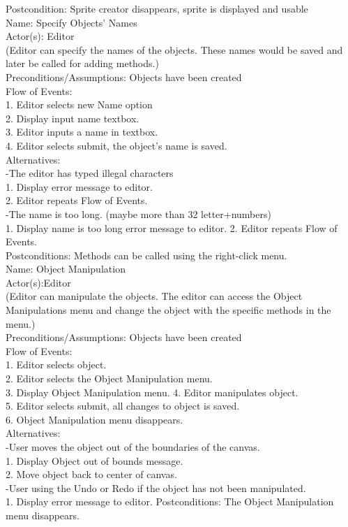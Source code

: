 \documentclass[12pt]{report}
\begin{document}
Postcondition: Sprite creator disappears, sprite is displayed and usable\\[2\baselineskip]
Name: Specify Objects' Names\\
Actor(s): Editor\\
(Editor can specify the names of the objects. These names would be saved and later be called for adding methods.)\\
Preconditions/Assumptions: Objects have been created\\[1\baselineskip]
Flow of Events: \\
1. Editor selects new Name option\\
2. Display input name textbox.\\
3. Editor inputs a name in textbox.\\
4. Editor selects submit, the object's name is saved.\\
Alternatives: \\
-The editor has typed illegal characters\\
1. Display error message to editor.\\
2. Editor repeats Flow of Events.\\
-The name is too long. (maybe more than 32 letter+numbers)\\
1. Display name is too long error message to editor.
2. Editor repeats Flow of Events.\\
Postconditions: Methods can be called using the right-click menu.\\[2\baselineskip]
Name: Object Manipulation\\
Actor(s):Editor\\
(Editor can manipulate the objects. The editor can access the Object Manipulations menu and change the object with the specific methods in the menu.)\\
Preconditions/Assumptions: Objects have been created\\[1\baselineskip]
Flow of Events: \\
1. Editor selects object.\\
2. Editor selects the Object Manipulation menu.\\
3. Display Object Manipulation menu.
4. Editor manipulates object. \\
5. Editor selects submit, all changes to object is saved.\\
6. Object Manipulation menu disappears.\\
Alternatives:\\
-User moves the object out of the boundaries of the canvas.\\
1. Display Object out of bounds message.\\
2. Move object back to center of canvas.\\
-User using the Undo or Redo if the object has not been manipulated. \\[1\baselineskip]
1. Display error message to editor.
Postconditions: The Object Manipulation menu disappears.\\[2\baselineskip]
\end{document}
